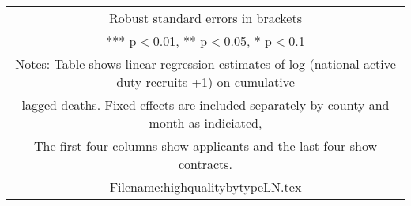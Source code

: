 \documentclass[]{article}
\begin{document}
\begin{tabular}{lcccccccc}
\multicolumn{9}{c}{ Robust standard errors in brackets} \\
\multicolumn{9}{c}{ *** p$<$0.01, ** p$<$0.05, * p$<$0.1} \\
\multicolumn{9}{c}{ Notes: Table shows linear regression estimates of log (national active duty recruits +1) on cumulative} \\
\multicolumn{9}{c}{ lagged deaths. Fixed effects are included separately by county and month as indiciated,} \\
\multicolumn{9}{c}{ The first four columns show applicants and the last four show contracts.} \\
\multicolumn{9}{c}{ Filename:highqualitybytypeLN.tex} \\
\end{tabular}
\end{document}
